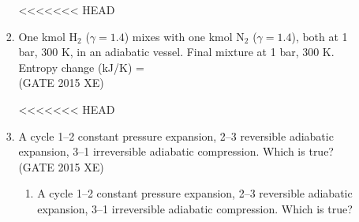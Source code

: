\documentclass[journal,12pt,onecolumn]{IEEEtran}
\begin{document}
\begin{enumerate}
\begin{enumerate}
\begin{enumerate}
\begin{multicols}{4}
<<<<<<< HEAD
\end{multicols}

\item One kmol H$_2$ ($\gamma=1.4$) mixes with one kmol N$_2$ ($\gamma=1.4$), both at 1 bar, 300 K, in an adiabatic vessel. Final mixture at 1 bar, 300 K. Entropy change (kJ/K) =  \\
\hfill{(GATE 2015 XE)} 
\begin{multicols}{4}
<<<<<<< HEAD
\end{multicols}

\newpage 

\item A cycle 1–2 constant pressure expansion, 2–3 reversible adiabatic expansion, 3–1 irreversible adiabatic compression. Which is true?  \\
\hfill{(GATE 2015 XE)} 
\begin{multicols}{2}
\begin{enumerate}
=======
\vspace{0.5cm}

\item A cycle 1–2 constant pressure expansion, 2–3 reversible adiabatic expansion, 3–1 irreversible adiabatic compression. Which is true?  
\hfill{} \\


\end{enumerate}
\end{multicols}
\end{enumerate}
\end{enumerate}
\end{enumerate}
\end{document}
